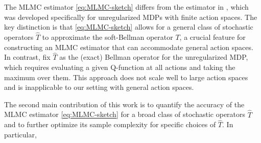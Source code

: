 \documentclass[11pt]{article}
\numberwithin{equation}{section}
\theoremstyle{definition}
\theoremstyle{remark}
\newcommand{\citet}{\cite}
\begin{document}
The MLMC estimator \eqref{eq:MLMC-sketch} differs from the estimator in \citet{beck2023nonlinearmontecarlomethods}, which was developed specifically for unregularized MDPs with finite action spaces.
The key distinction is that \eqref{eq:MLMC-sketch} allows for a   general class of stochastic operators $\hat T$ to approximate 
the soft-Bellman operator $T$, a crucial feature for constructing an MLMC estimator that can accommodate general action spaces.
In contrast, \citet{beck2023nonlinearmontecarlomethods} fix  $\hat T$ as the (exact) Bellman operator for the unregularized MDP, which requires evaluating a given Q-function at all actions and taking the maximum over them. This approach does not scale well to large action spaces and is inapplicable to our setting with general action spaces. 

  
The second main contribution of this work is to quantify the accuracy  of the MLMC estimator \eqref{eq:MLMC-sketch} for a broad class of stochastic operators $\hat T$ and to further optimize its sample complexity for specific choices of $\hat T$. In particular, 
\end{document}
